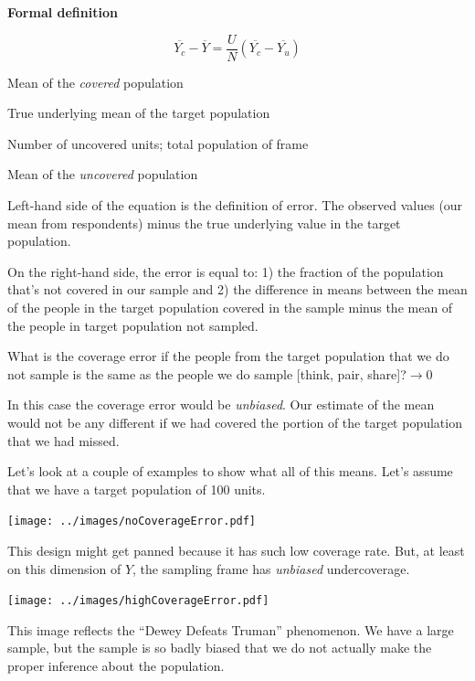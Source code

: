 \documentclass[11pt]{lecturenotes}
\begin{document}
\textbf{Formal definition}

\slide\[
\overline{Y_c} - \overline{Y} = \frac{U}{N}\left(\overline{Y_c} - \overline{Y_u}\right)
\]

\begin{description}[noitemsep]
\item[$\overline{Y_c}$] Mean of the \emph{covered} population
\item[$\overline{Y}$] True underlying mean of the target population
\item[$U,N$] Number of uncovered units; total population of frame
\item[$\overline{Y_u}$] Mean of the \emph{uncovered} population
\end{description}

Left-hand side of the equation is the definition of error. The observed values (our mean from respondents) minus the true underlying value in the target population. 

On the right-hand side, the error is equal to: 1) the fraction of the population that's not covered in our sample and 2) the difference in means between the mean of the people in the target population covered in the sample minus the mean of the people in target population not sampled. 

What is the coverage error if the people from the target population that we do not sample is the same as the people we do sample [think, pair, share]?$\longrightarrow$0

In this case the coverage error would be \emph{unbiased}. Our estimate of the mean would not be any different if we had covered the portion of the target population that we had missed. 

Let's look at a couple of examples to show what all of this means. Let's assume that we have a target population of 100 units. 

\begin{center}
\texttt{[image: ../images/noCoverageError.pdf]}
\end{center}

\slide This design might get panned because it has such low coverage rate. But, at least on this dimension of $Y$, the sampling frame has \emph{unbiased} undercoverage. 

\begin{center}
\texttt{[image: ../images/highCoverageError.pdf]}
\end{center}

\slide This image reflects the ``Dewey Defeats Truman'' phenomenon. We have a large sample, but the sample is so badly biased that we do not actually make the proper inference about the population.
\end{document}
